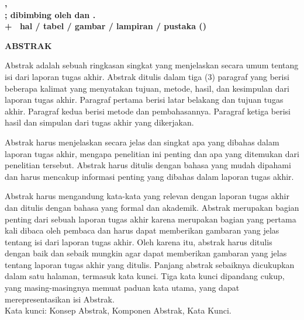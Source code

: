 
\clearpage
{}
{}
\noindent\textbf{\penulis, \nim}\\
\textbf{\MakeUppercase{\judulid}; dibimbing oleh {\pembimbingutama} dan {\pembimbingpendamping}.}\\
\textbf{\pageref{LastPage} + \getromanpagelast\ hal /  tabel /  gambar /  lampiran /  pustaka (\takunakademik)}
\begin{center}
    \textbf{ABSTRAK}\\[0.5cm]
\end{center}

Abstrak adalah sebuah ringkasan singkat yang menjelaskan secara umum tentang isi dari laporan tugas akhir. Abstrak ditulis dalam tiga (3) paragraf yang berisi beberapa kalimat yang menyatakan tujuan, metode, hasil, dan kesimpulan dari laporan tugas akhir. Paragraf pertama berisi latar belakang dan tujuan tugas akhir. Paragraf kedua berisi metode dan pembahasannya. Paragraf ketiga berisi hasil dan simpulan dari tugas akhir yang dikerjakan.

Abstrak harus menjelaskan secara jelas dan singkat apa yang dibahas dalam laporan tugas akhir, mengapa penelitian ini penting dan apa yang ditemukan dari penelitian tersebut. Abstrak harus ditulis dengan bahasa yang mudah dipahami dan harus mencakup informasi penting yang dibahas dalam laporan tugas akhir. 

Abstrak harus mengandung kata-kata yang relevan dengan laporan tugas akhir dan ditulis dengan bahasa yang formal dan akademik. Abstrak merupakan bagian penting dari sebuah laporan tugas akhir karena merupakan bagian yang pertama kali dibaca oleh pembaca dan harus dapat memberikan gambaran yang jelas tentang isi dari laporan tugas akhir. Oleh karena itu, abstrak harus ditulis dengan baik dan sebaik mungkin agar dapat memberikan gambaran yang jelas tentang laporan tugas akhir yang ditulis. Panjang abstrak sebaiknya dicukupkan dalam satu halaman, termasuk kata kunci. Tiga kata kunci dipandang cukup, yang masing-masingnya memuat paduan kata utama, yang dapat merepresentasikan isi Abstrak.\\[0.6cm]

\noindent Kata kunci: Konsep Abstrak, Komponen Abstrak, Kata Kunci.

